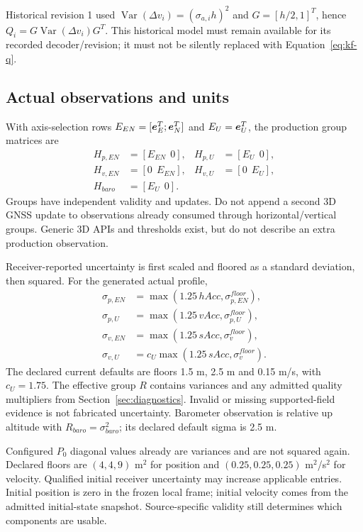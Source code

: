 Historical revision 1 used $\operatorname{Var}(\Delta v_i)=(\sigma_{a,i}h)^2$ and $G=[h/2,1]^T$, hence $Q_i=G\operatorname{Var}(\Delta v_i)G^T$. This historical model must remain available for its recorded decoder/revision; it must not be silently replaced with Equation~\eqref{eq:kf-q}.

\subsection{Actual observations and units}
With axis-selection rows $E_{EN}=[\boldsymbol{e}_E^T;\boldsymbol{e}_N^T]$ and $E_U=\boldsymbol{e}_U^T$, the production group matrices are
\begin{align}
H_{p,EN}&=[E_{EN}\ \ 0],&H_{p,U}&=[E_U\ \ 0],\\
H_{v,EN}&=[0\ \ E_{EN}],&H_{v,U}&=[0\ \ E_U],\\
H_{baro}&=[E_U\ \ 0].
\end{align}
Groups have independent validity and updates. Do not append a second 3D GNSS update to observations already consumed through horizontal/vertical groups. Generic 3D APIs and thresholds exist, but do not describe an extra production observation.

Receiver-reported uncertainty is first scaled and floored as a standard deviation, then squared. For the generated actual profile,
\begin{align}
\sigma_{p,EN}&=\max(1.25\,hAcc,\sigma_{p,EN}^{floor}),\\
\sigma_{p,U}&=\max(1.25\,vAcc,\sigma_{p,U}^{floor}),\\
\sigma_{v,EN}&=\max(1.25\,sAcc,\sigma_v^{floor}),\\
\sigma_{v,U}&=c_U\max(1.25\,sAcc,\sigma_v^{floor}).
\end{align}
The declared current defaults are floors 1.5 m, 2.5 m and 0.15 m/s, with $c_U=1.75$. The effective group $R$ contains variances and any admitted quality multipliers from Section~\ref{sec:diagnostics}. Invalid or missing supported-field evidence is not fabricated uncertainty. Barometer observation is relative up altitude with $R_{baro}=\sigma_{baro}^2$; its declared default sigma is 2.5 m.

Configured $P_0$ diagonal values already are variances and are not squared again. Declared floors are $(4,4,9)$ m$^2$ for position and $(0.25,0.25,0.25)$ m$^2$/s$^2$ for velocity. Qualified initial receiver uncertainty may increase applicable entries. Initial position is zero in the frozen local frame; initial velocity comes from the admitted initial-state snapshot. Source-specific validity still determines which components are usable.

